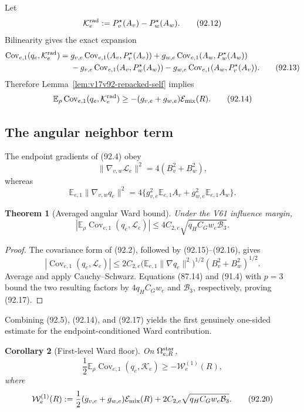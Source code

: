 \documentclass[11pt]{article}
\newtheorem{theorem}{Theorem}[section]
\newtheorem{corollary}[theorem]{Corollary}
\theoremstyle{remark}
\begin{document}
Let
\[
 \mathcal K_e^{\rm rad}
 :=P_v^\star(A_v)-P_w^\star(A_w).                   \tag{92.12}
\]
Bilinearity gives the exact expansion
\[
\begin{aligned}
 \operatorname{Cov}_{e,1}(q_e,\mathcal K_e^{\rm rad})
 ={}&g_{v,e}\operatorname{Cov}_{e,1}(A_v,P_v^\star(A_v))
    +g_{w,e}\operatorname{Cov}_{e,1}(A_w,P_w^\star(A_w))\\
 &-g_{v,e}\operatorname{Cov}_{e,1}(A_v,P_w^\star(A_w))
  -g_{w,e}\operatorname{Cov}_{e,1}(A_w,P_v^\star(A_v)).            \tag{92.13}
\end{aligned}
\]
Therefore Lemma~\ref{lem:v17v92-repacked-self} implies
\[
 \mathbb E_\rho
 \operatorname{Cov}_{e,1}(q_e,\mathcal K_e^{\rm rad})
 \geq-(g_{v,e}+g_{w,e})\mathcal E_{\rm mix}(R).     \tag{92.14}
\]

\subsection{The angular neighbor term}

The endpoint gradients of (92.4) obey
\[
 \|\nabla_{v,w}\mathcal L_e\|^2
 =4(B_v^2+B_w^2),                                   \tag{92.15}
\]
whereas
\[
 \mathbb E_{e,1}\|\nabla_{v,w}q_e\|^2
 =4\{g_{v,e}^2\mathbb E_{e,1}A_v
       +g_{w,e}^2\mathbb E_{e,1}A_w\}.              \tag{92.16}
\]

\begin{theorem}[Averaged angular Ward bound]
\label{thm:v17v92-angular}
Under the V61 influence margin,
\[
\boxed{
 \left|\mathbb E_\rho
   \operatorname{Cov}_{e,1}(q_e,\mathcal L_e)\right|
 \leq4C_{2,e}\sqrt{q_HC_Gw_e\mathcal B_3}.}         \tag{92.17}
\]
\end{theorem}

\begin{proof}
The covariance form of (92.2), followed by (92.15)--(92.16), gives
\[
 |\operatorname{Cov}_{e,1}(q_e,\mathcal L_e)|
 \leq2C_{2,e}
 \bigl(\mathbb E_{e,1}\|\nabla q_e\|^2\bigr)^{1/2}
 (B_v^2+B_w^2)^{1/2}.                               \tag{92.18}
\]
Average and apply Cauchy--Schwarz.  Equations (87.14) and (91.4) with
\(p=3\) bound the two resulting factors by
\(4q_HC_Gw_e\) and \(\mathcal B_3\), respectively, proving (92.17).
\end{proof}

Combining (92.5), (92.14), and (92.17) yields the first genuinely
one-sided estimate for the endpoint-conditioned Ward contribution.

\begin{corollary}[First-level Ward floor]
\label{cor:v17v92-first-level}
On \(\Omega_{e,R}^{\rm star}\),
\[
\boxed{
 \frac12\mathbb E_\rho
  \operatorname{Cov}_{e,1}(q_e,\mathcal K_e)
 \geq-\mathcal W_e^{(1)}(R),}                       \tag{92.19}
\]
where
\[
 \mathcal W_e^{(1)}(R)
 :=\frac12(g_{v,e}+g_{w,e})\mathcal E_{\rm mix}(R)
   +2C_{2,e}\sqrt{q_HC_Gw_e\mathcal B_3}.           \tag{92.20}
\]
\end{corollary}
\end{document}
